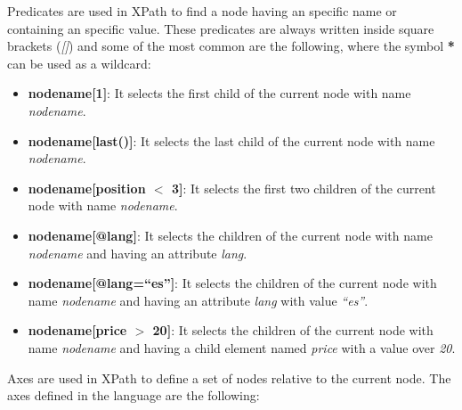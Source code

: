 Predicates are used in XPath to find a node having an specific name or containing an specific value. These predicates are always written inside square brackets (\textit{[]}) and some of the most common are the following, where the symbol \textbf{*} can be used as a wildcard:

\begin{itemize}

\item \textbf{nodename[1]}: It selects the first child of the current node with name \textit{nodename}.

\item \textbf{nodename[last()]}: It selects the last child of the current node with name \textit{nodename}.

\item \textbf{nodename[position $<$ 3]}: It selects the first two children of the current node with name \textit{nodename}.

\item \textbf{nodename[@lang]}: It selects the children of the current node with name \textit{nodename} and having an attribute \textit{lang}.

\item \textbf{nodename[@lang=``es'']}: It selects the children of the current node with name \textit{nodename} and having an attribute \textit{lang} with value \textit{``es''}.

\item \textbf{nodename[price $>$ 20]}: It selects the children of the current node with name \textit{nodename} and having a child element named \textit{price} with a value over \textit{20}.

\end{itemize}

Axes are used in XPath to define a set of nodes relative to the current node. The axes defined in the language are the following:

